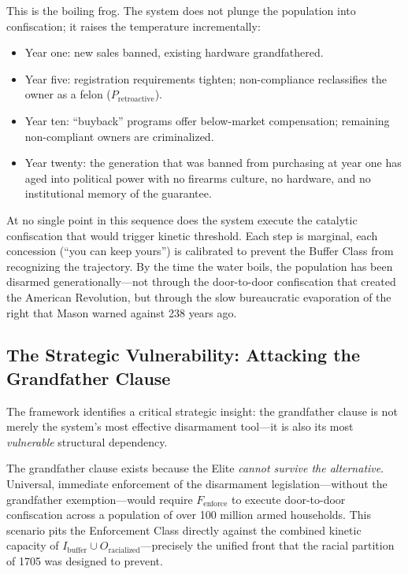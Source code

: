 \documentclass[12pt,openany]{book}
\begin{document}
This is the boiling frog. The system does not plunge the population into confiscation; it raises the temperature incrementally:
\begin{itemize}
    \item Year one: new sales banned, existing hardware grandfathered.
    \item Year five: registration requirements tighten; non-compliance reclassifies the owner as a felon ($P_{\text{retroactive}}$).
    \item Year ten: ``buyback'' programs offer below-market compensation; remaining non-compliant owners are criminalized.
    \item Year twenty: the generation that was banned from purchasing at year one has aged into political power with no firearms culture, no hardware, and no institutional memory of the guarantee.
\end{itemize}

At no single point in this sequence does the system execute the catalytic confiscation that would trigger kinetic threshold. Each step is marginal, each concession (``you can keep yours'') is calibrated to prevent the Buffer Class from recognizing the trajectory. By the time the water boils, the population has been disarmed generationally---not through the door-to-door confiscation that created the American Revolution, but through the slow bureaucratic evaporation of the right that Mason warned against 238 years ago.

\subsection{The Strategic Vulnerability: Attacking the Grandfather Clause}

The framework identifies a critical strategic insight: the grandfather clause is not merely the system's most effective disarmament tool---it is also its most \textit{vulnerable} structural dependency.

The grandfather clause exists because the Elite \textit{cannot survive the alternative}. Universal, immediate enforcement of the disarmament legislation---without the grandfather exemption---would require $F_{\text{enforce}}$ to execute door-to-door confiscation across a population of over 100 million armed households. This scenario pits the Enforcement Class directly against the combined kinetic capacity of $I_{\text{buffer}} \cup O_{\text{racialized}}$---precisely the unified front that the racial partition of 1705 was designed to prevent.
\end{document}
